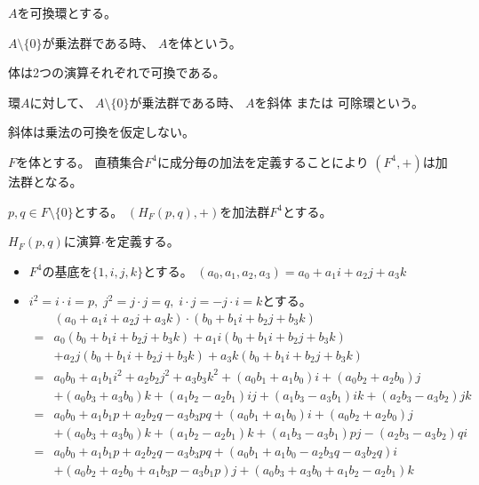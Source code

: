 \documentclass[12pt,b5paper]{ltjsarticle}
\begin{document}
\hrulefill

$A$を可換環とする。

$A \setminus \{0\}$が乗法群である時、
$A$を体という。

体は2つの演算それぞれで可換である。

\dotfill

環$A$に対して、
$A\setminus\{0\}$が乗法群である時、
$A$を斜体 または 可除環という。

斜体は乗法の可換を仮定しない。

\dotfill

$F$を体とする。
直積集合$F^{4}$に成分毎の加法を定義することにより
$(F^{4},+)$は加法群となる。

$p,q \in F \setminus \{0\}$とする。
$(H_{F}(p,q),+)$を加法群$F^{4}$とする。

$H_{F}(p,q)$に演算$\cdot$を定義する。

\begin{itemize}
 \item[] $F^{4}$の基底を$\{1,i,j,k\}$とする。
         $(a_{0},a_{1},a_{2},a_{3})=a_{0}+a_{1}i + a_{2}j+a_{3}k$
 \item[] $i^{2}=i\cdot i=p,\; j^{2}=j\cdot j=q,\; i\cdot j= -j\cdot i=k$とする。
         \begin{align}
          & (a_{0}+a_{1}i + a_{2}j+a_{3}k) \cdot (b_{0}+b_{1}i + b_{2}j+b_{3}k)\\
          = & a_{0} (b_{0} +b_{1}i +b_{2}j +b_{3}k)
            + a_{1}i (b_{0} +b_{1}i +b_{2}j +b_{3}k)\\
          & + a_{2}j (b_{0} +b_{1}i +b_{2}j +b_{3}k)
            + a_{3}k (b_{0} +b_{1}i +b_{2}j +b_{3}k)\\
          = & a_{0}b_{0} +a_{1}b_{1}i^{2} +a_{2}b_{2}j^{2} +a_{3}b_{3}k^{2}
            + (a_{0}b_{1} +a_{1}b_{0})i
            + (a_{0}b_{2} +a_{2}b_{0})j\\
          & + (a_{0}b_{3} +a_{3}b_{0})k
            + (a_{1}b_{2} -a_{2}b_{1})ij
            + (a_{1}b_{3} -a_{3}b_{1})ik
            + (a_{2}b_{3} -a_{3}b_{2})jk\\
          = & a_{0}b_{0} +a_{1}b_{1}p +a_{2}b_{2}q -a_{3}b_{3}pq
            + (a_{0}b_{1} +a_{1}b_{0})i
            + (a_{0}b_{2} +a_{2}b_{0})j\\
          & + (a_{0}b_{3} +a_{3}b_{0})k
            + (a_{1}b_{2} -a_{2}b_{1})k
            + (a_{1}b_{3} -a_{3}b_{1})pj
            - (a_{2}b_{3} -a_{3}b_{2})qi\\
          = & a_{0}b_{0} +a_{1}b_{1}p +a_{2}b_{2}q -a_{3}b_{3}pq
            + (a_{0}b_{1} +a_{1}b_{0} -a_{2}b_{3}q -a_{3}b_{2}q)i\\
           & + (a_{0}b_{2} +a_{2}b_{0} +a_{1}b_{3}p -a_{3}b_{1}p)j
            + (a_{0}b_{3} +a_{3}b_{0} +a_{1}b_{2} -a_{2}b_{1})k
         \end{align}

\end{itemize}
\end{document}
